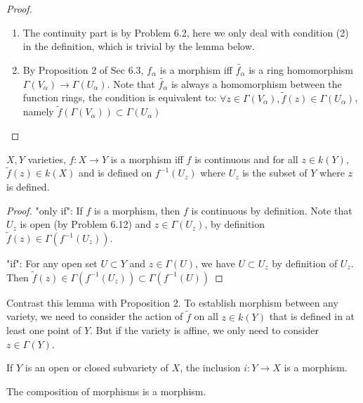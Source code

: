\documentclass{solution}
\begin{document}
\begin{proof}
    \begin{enumerate}
        \item The continuity part is by Problem 6.2, here we only deal with condition (2) in the definition, which is trivial by the lemma below.
        \item By Proposition 2 of Sec 6.3, $f_\alpha$ is a morphism iff $\tilde{f_\alpha}$ is a ring homomorphism $\Gamma(V_\alpha) \rightarrow \Gamma(U_\alpha)$. Note that $\tilde{f_{\alpha}}$ is always a homomorphism between the function rings, the condition is equivalent to: $\forall z \in \Gamma(V_\alpha), \tilde{f}(z) \in \Gamma(U_\alpha)$, namely $\tilde{f}(\Gamma(V_\alpha)) \subset \Gamma(U_\alpha)$
    \end{enumerate}
\end{proof}

\begin{lemma}\label{lem:morphism-definition}
    $X, Y$ varieties, $f: X \rightarrow Y$ is a morphism iff $f$ is continuous and for all $z \in k(Y)$, $\tilde{f}(z) \in k(X)$ and is defined on $f^{-1}(U_z)$ where $U_z$ is the subset of $Y$ where $z$ is defined.
\end{lemma}

\begin{proof}
    "only if": If $f$ is a morphism, then $f$ is continuous by definition. Note that $U_z$ is open (by Problem 6.12) and $z \in \Gamma(U_z)$, by definition $\tilde{f}(z) \in \Gamma(f ^{-1}(U_z))$.

    "if": For any open set $U \subset Y$ and $z \in \Gamma(U)$, we have $U \subset U_z$ by definition of $U_z$. Then $\tilde{f}(z) \in \Gamma(f ^{-1} (U_z)) \subset \Gamma(f ^{-1}(U))$
\end{proof}

Contrast this lemma with Proposition 2. To establish morphism between any variety, we need to consider the action of $\tilde{f}$ on all $z \in k(Y)$ that is defined in at least one point of $Y$. But if the variety is affine, we only need to consider $z \in \Gamma(Y)$.

\begin{problem}{6.15}
    \begin{inparaenum}
        \item If $Y$ is an open or closed subvariety of $X$, the inclusion $i: Y \rightarrow X$ is a morphism.
        \item The composition of morphisms is a morphism.
    \end{inparaenum}
\end{problem}
\end{document}
